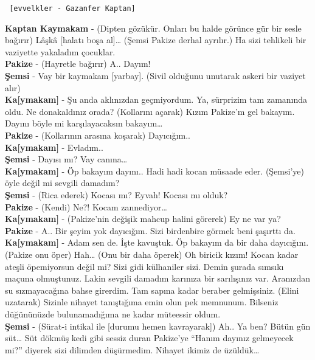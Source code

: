 \documentclass[]{book}
\begin{document}
\begin{verbatim}
 [evvelkler - Gazanfer Kaptan]
\end{verbatim}

\textbf{Kaptan Kaymakam} - (Dipten gözükür. Onları bu halde görünce gür bir sesle bağırır) Lâşkâ {[}halatı boşa al{]}\ldots{} (Şemsi Pakize derhal ayrılır.) Ha sizi tehlikeli bir vaziyette yakaladım çocuklar.\\
\textbf{Pakize} - (Hayretle bağırır) A.. Dayım!\\
\textbf{Şemsi} - Vay bir kaymakam {[}yarbay{]}. (Sivil olduğunu unutarak askeri bir vaziyet alır)\\
\textbf{Ka{[}ymakam{]}} - Şu anda aklınızdan geçmiyordum. Ya, sürprizim tam zamanında oldu. Ne donakaldınız orada? (Kollarını açarak) Kızım Pakize'm gel bakayım. Dayını böyle mi karşılayacaksın bakayım\ldots{}\\
\textbf{Pakize} - (Kollarının arasına koşarak) Dayıcığım..\\
\textbf{Ka{[}ymakam{]}} - Evladım..\\
\textbf{Şemsi} - Dayısı mı? Vay canına\ldots{}\\
\textbf{Ka{[}ymakam{]}} - Öp bakayım dayını.. Hadi hadi kocan müsaade eder. (Şemsi'ye) öyle değil mi sevgili damadım?\\
\textbf{Şemsi} - (Rica ederek) Kocası mı? Eyvah! Kocası mı olduk?\\
\textbf{Pakize} - (Kendi) Ne?! Kocam zannediyor\ldots{}\\
\textbf{Ka{[}ymakam{]}} - (Pakize'nin değişik mahcup halini görerek) Ey ne var ya?\\
\textbf{Pakize} - A.. Bir şeyim yok dayıcığım. Sizi birdenbire görmek beni şaşırttı da.\\
\textbf{Ka{[}ymakam{]}} - Adam sen de. İşte kavuştuk. Öp bakayım da bir daha dayıcığını. (Pakize onu öper) Hah\ldots{} (Onu bir daha öperek) Oh biricik kızım! Kocan kadar ateşli öpemiyorsun değil mi? Sizi gidi külhaniler sizi. Demin şurada sımsıkı maçuna olmuştunuz. Lakin sevgili damadım karınıza bir sarılışınız var. Aranızdan su sızmayacağına bahse girerdim. Tam sapına kadar beraber gelmişsiniz. (Elini uzatarak) Sizinle nihayet tanıştığıma emin olun pek memnunum. Bilseniz düğününüzde bulunamadığıma ne kadar müteessir oldum.\\
\textbf{Şemsi} - (Sürat-i intikal ile {[}durumu hemen kavrayarak{]}) Ah.. Ya ben? Bütün gün süt\ldots{} Süt dökmüş kedi gibi sessiz duran Pakize'ye ``Hanım dayınız gelmeyecek mi?'' diyerek sizi dilimden düşürmedim. Nihayet ikimiz de üzüldük\ldots{}\\
\end{document}
